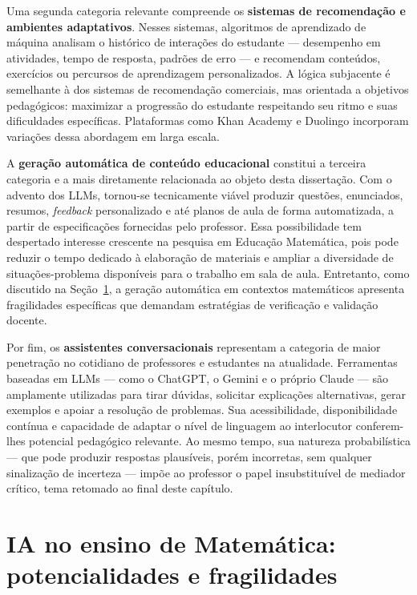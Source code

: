 Uma segunda categoria relevante compreende os \textbf{sistemas de recomendação e ambientes
adaptativos}. Nesses sistemas, algoritmos de aprendizado de máquina analisam o histórico de
interações do estudante --- desempenho em atividades, tempo de resposta, padrões de erro --- e
recomendam conteúdos, exercícios ou percursos de aprendizagem personalizados. A lógica subjacente
é semelhante à dos sistemas de recomendação comerciais, mas orientada a objetivos pedagógicos:
maximizar a progressão do estudante respeitando seu ritmo e suas dificuldades específicas.
Plataformas como Khan Academy e Duolingo incorporam variações dessa abordagem em larga escala.

A \textbf{geração automática de conteúdo educacional} constitui a terceira categoria e a mais
diretamente relacionada ao objeto desta dissertação. Com o advento dos LLMs, tornou-se
tecnicamente viável produzir questões, enunciados, resumos, \emph{feedback} personalizado e até
planos de aula de forma automatizada, a partir de especificações fornecidas pelo professor. Essa
possibilidade tem despertado interesse crescente na pesquisa em Educação Matemática, pois pode
reduzir o tempo dedicado à elaboração de materiais e ampliar a diversidade de situações-problema
disponíveis para o trabalho em sala de aula. Entretanto, como discutido na
Seção~\ref{sec:ia-matematica}, a geração automática em contextos matemáticos apresenta
fragilidades específicas que demandam estratégias de verificação e validação docente.

Por fim, os \textbf{assistentes conversacionais} representam a categoria de maior penetração no
cotidiano de professores e estudantes na atualidade. Ferramentas baseadas em LLMs --- como o
ChatGPT, o Gemini e o próprio Claude --- são amplamente utilizadas para tirar dúvidas, solicitar
explicações alternativas, gerar exemplos e apoiar a resolução de problemas. Sua acessibilidade,
disponibilidade contínua e capacidade de adaptar o nível de linguagem ao interlocutor conferem-lhes
potencial pedagógico relevante. Ao mesmo tempo, sua natureza probabilística --- que pode produzir
respostas plausíveis, porém incorretas, sem qualquer sinalização de incerteza --- impõe ao
professor o papel insubstituível de mediador crítico, tema retomado ao final deste capítulo.

\section{IA no ensino de Matemática: potencialidades e fragilidades}
\label{sec:ia-matematica}

